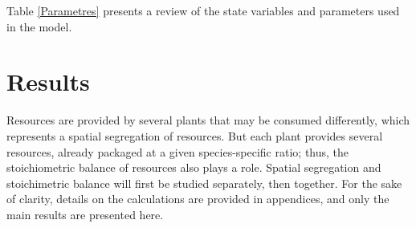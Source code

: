 \documentclass[12pt]{article}
\begin{document}
Table \ref{Parametres} presents a review of the state variables and parameters used in the model. %

\section*{Results}
Resources are provided by several plants that may be consumed differently, which represents a spatial segregation of resources. But each plant provides several resources, already packaged at a given species-specific ratio; thus, the stoichiometric balance of resources also plays a role. %
Spatial segregation and stoichimetric balance will first be studied separately, then together. For the sake of clarity, details on the calculations are provided in appendices, and only the main results are presented here. 
\end{document}
